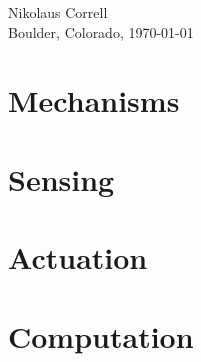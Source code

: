 \documentclass[paper=6.14in:9.21in,pagesize=pdftex,11pt,twoside,openright]{scrbook}
\begin{document}
\begin{flushright}
Nikolaus Correll\\
Boulder, Colorado, \today
\end{flushright}



\part{Mechanisms}





\part{Sensing}

% 

\part{Actuation}

\part{Computation}

















\appendix











\printindex
\end{document}
